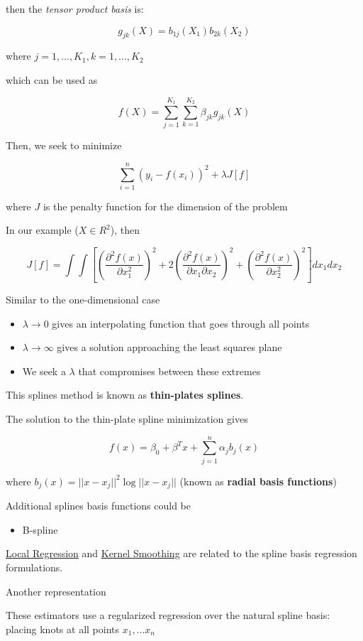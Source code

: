 \documentclass[
]{book}
\providecommand{\tightlist}{%
  \setlength{\itemsep}{0pt}\setlength{\parskip}{0pt}}
\begin{document}
then the \emph{tensor product basis} is:

\[
g_{jk}(X) = b_{1j}(X_1)b_{2k}(X_2)
\]

where \(j = 1, \dots, K_1, k = 1, \dots, K_2\)

which can be used as

\[
f(X) = \sum_{j=1}^{K_1} \sum_{k=1}^{K_2}\beta_{jk}g_{jk}(X)
\]

Then, we seek to minimize

\[
\sum_{i=1}^n (y_i - f(x_i))^2 + \lambda J[f]
\]

where \(J\) is the penalty function for the dimension of the problem

In our example (\(X \in R^2\)), then

\[
J[f] = \int\int[(\frac{\partial^2f(x)}{\partial x_1^2})^2 + 2(\frac{\partial^2 f(x)}{\partial x_1 \partial x_2})^2 + (\frac{\partial^2f(x)}{\partial x^2_2})^2]dx_1 dx_2
\]

Similar to the one-dimensional case

\begin{itemize}
\item
  \(\lambda \to 0\) gives an interpolating function that goes through all points
\item
  \(\lambda \to \infty\) gives a solution approaching the least squares plane
\item
  We seek a \(\lambda\) that compromises between these extremes
\end{itemize}

This splines method is known as \textbf{thin-plates splines}.

The solution to the thin-plate spline minimization gives

\[
f(x) = \beta_0 + \beta^T x + \sum_{j=1}^n \alpha_j b_j(x)
\]

where \(b_j(x) = ||x - x_j||^2\log ||x-x_j||\) (known as \textbf{radial basis functions})

Additional splines basis functions could be

\begin{itemize}
\tightlist
\item
  B-spline
\end{itemize}

\protect\hyperlink{local-regression}{Local Regression} and \protect\hyperlink{kernel-smoothing}{Kernel Smoothing} are related to the spline basis regression formulations.

Another representation

These estimators use a regularized regression over the natural spline basis: placing knots at all points \(x_1,...x_n\)
\end{document}

